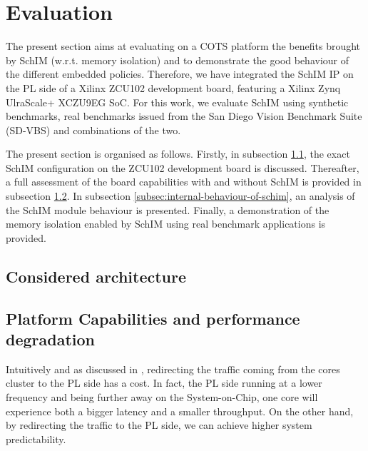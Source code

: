 \section{Evaluation}

  The present section aims at evaluating on a COTS platform the benefits brought by SchIM (w.r.t. memory isolation) and to demonstrate the good behaviour of the different embedded policies. Therefore, we have integrated the SchIM IP on the PL side of a Xilinx ZCU102 development board, featuring a Xilinx Zynq UlraScale+ XCZU9EG SoC. For this work, we evaluate SchIM using synthetic benchmarks, real benchmarks issued from the San Diego Vision Benchmark Suite (SD-VBS) \cite{SD-VBS} and combinations of the two.
  
  The present section is organised as follows. Firstly, in subsection \ref{subsection:considered-architecture}, the exact SchIM configuration on the ZCU102 development board is discussed. Thereafter, a full assessment of the board capabilities with and without SchIM is provided in subsection \ref{subsec:platform-capabilities-and-performance-degradation}. In subsection \ref{subsec:internal-behaviour-of-schim}, an analysis of the SchIM module behaviour is presented. Finally, a demonstration of the memory isolation enabled by SchIM using real benchmark applications is provided.

  \subsection{Considered architecture}
    \label{subsection:considered-architecture}

  \subsection{Platform Capabilities and performance degradation}
    \label{subsec:platform-capabilities-and-performance-degradation}
    Intuitively and as discussed in \cite{PLIM20}, redirecting the traffic coming from the cores cluster to the PL side has a cost. In fact, the PL side running at a lower frequency and being further away on the System-on-Chip, one core will experience both a bigger latency and a smaller throughput. On the other hand, by redirecting the traffic to the PL side, we can achieve higher system predictability.
    
